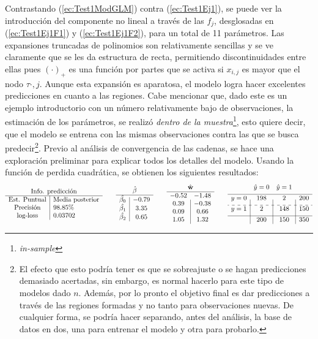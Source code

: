 \documentclass[../Main/Main.tex]{subfiles}
\begin{document}
Contrastando (\ref{ec:Test1ModGLM}) contra (\ref{ec:Test1Ej1}), se puede ver la introducción del componente no lineal a través de las $f_j$, desglosadas en (\ref{ec:Test1Ej1F1}) y (\ref{ec:Test1Ej1F2}), para un total de 11 parámetros. Las expansiones truncadas de polinomios son relativamente sencillas y se ve claramente que se les da estructura de recta, permitiendo discontinuidades entre ellas pues $(\cdot)_+$ es una función por partes que se activa si $x_{i,j}$ es mayor que el nodo $\tau{\cdot,j}$. Aunque esta expansión es aparatosa, el modelo logra hacer excelentes predicciones en cuanto a las regiones. Cabe mencionar que, dado este es un ejemplo introductorio con un número relativamente bajo de observaciones, la estimación de los parámetros, se realizó \textit{dentro de la muestra}\footnote{\textit{in-sample}}, esto quiere decir, que el modelo se entrena con las mismas observaciones contra las que se busca predecir\footnote{El efecto que esto podría tener es que se sobreajuste o se hagan predicciones demasiado acertadas, sin embargo, es normal hacerlo para este tipo de modelos dado $n$. Además, por lo pronto el objetivo final es dar predicciones a través de las regiones formadas y no tanto para observaciones nuevas. De cualquier forma, se podría hacer separando, antes del análisis, la base de datos en dos, una para entrenar el modelo y otra para probarlo.}. Previo al análisis de convergencia de las cadenas, se hace una exploración preliminar para explicar todos los detalles del modelo. Usando la función de perdida cuadrática, se obtienen los siguientes resultados:
\begin{align*}
\resultados{\text{Media posterior}}{98.85}{0.03702}
\quad\quad
\begin{array}{c|c}
\multicolumn{2}{c}{\hat{\beta}} \\
\hline
\hat{\beta_0} & -0.79 \\
\hat{\beta_1} & 3.35 \\
\hat{\beta_2} & 0.65 \\
\end{array}
\quad\quad
\begin{array}{c|c}
\multicolumn{2}{c}{\hat{\wsn}} \\
\hline
-0.52 	& -1.48 \\
0.39	& -0.38 \\
0.09	& 0.66 \\
1.05	& 1.32
\end{array}
\quad\quad
\matconf{198}{2}{200}{2}{148}{150}{200}{150}{350}
\end{align*} 
\end{document}

